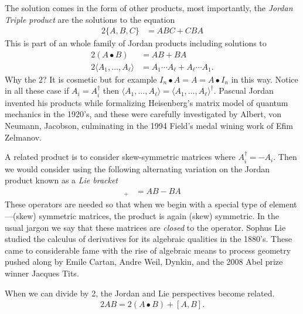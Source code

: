 The solution comes in the form of other products, most importantly, 
the  \emph{Jordan Triple product} are the solutions to the equation
\begin{align*}
    2\{A,B,C\} & = ABC+CBA
\end{align*}
This is part of an whole family of Jordan products including solutions to
\begin{align*}
    2(A\bullet B) & = AB+BA\\
    2\langle A_1,\ldots,A_{\ell}\rangle & = A_1\cdots A_{\ell}+A_{\ell}\cdots A_1.
\end{align*}
Why the 2?  It is cosmetic but for example $I_n\bullet A=A=A\bullet I_n$ in this way. 
Notice in all these case if $A_i=A_i^{\dagger}$ then $\langle A_1,\ldots,A_{\ell}\rangle=
\langle A_1,\ldots,A_{\ell}\rangle^{\dagger}$. 
Pascual Jordan invented his products while formalizing 
Heisenberg's matrix model of quantum mechanics in the 1920's, and these were 
carefully investigated by Albert, von Neumann, Jacobson, culminating in the 
1994 Field's medal wining work of Efim Zelmanov.


A related product is to consider 
skew-symmetric matrices where $A_i^{\dagger}=-A_i$.  Then we would consider using the following 
alternating variation on the Jordan product known as a \emph{Lie bracket}
\begin{align*}
    [A,B]_+ & = AB-BA
\end{align*}
These operators are needed so that when we begin with a special type of
element---(skew) symmetric matrices, the product is again (skew) symmetric.
In the usual jargon we say that these matrices are \emph{closed} to the operator.
Sophus Lie studied the calculus of derivatives for its algebraic 
qualities in the 1880's.  These came to considerable fame with the rise of algebraic means to process 
geometry pushed along by Emile Cartan, Andre Weil, Dynkin, and the 2008 Abel prize winner Jacques Tits. 

When we can divide by 2, the Jordan and Lie perspectives become related.
\begin{align*}
    2AB = 2(A\bullet B)+[A,B].
\end{align*}